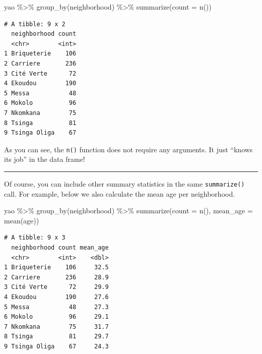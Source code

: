 \documentclass[
  letterpaper,
  DIV=11,
  numbers=noendperiod]{scrreprt}
\newenvironment{Shaded}{\begin{snugshade}}{\end{snugshade}}
\newcommand{\AttributeTok}[1]{\textcolor[rgb]{0.40,0.45,0.13}{#1}}
\newcommand{\FunctionTok}[1]{\textcolor[rgb]{0.28,0.35,0.67}{#1}}
\newcommand{\NormalTok}[1]{\textcolor[rgb]{0.00,0.23,0.31}{#1}}
\newcommand{\SpecialCharTok}[1]{\textcolor[rgb]{0.37,0.37,0.37}{#1}}
\begin{document}
\begin{Shaded}
\begin{Highlighting}[]
\NormalTok{yao }\SpecialCharTok{\%\textgreater{}\%} 
  \FunctionTok{group\_by}\NormalTok{(neighborhood) }\SpecialCharTok{\%\textgreater{}\%} 
  \FunctionTok{summarize}\NormalTok{(}\AttributeTok{count =} \FunctionTok{n}\NormalTok{())}
\end{Highlighting}
\end{Shaded}

\begin{verbatim}
# A tibble: 9 x 2
  neighborhood count
  <chr>        <int>
1 Briqueterie    106
2 Carriere       236
3 Cité Verte      72
4 Ekoudou        190
5 Messa           48
6 Mokolo          96
7 Nkomkana        75
8 Tsinga          81
9 Tsinga Oliga    67
\end{verbatim}

As you can see, the \texttt{n()} function does not require any
arguments. It just ``knows its job'' in the data frame!

\begin{center}\rule{0.5\linewidth}{0.5pt}\end{center}

Of course, you can include other summary statistics in the same
\texttt{summarize()} call. For example, below we also calculate the mean
age per neighborhood.

\begin{Shaded}
\begin{Highlighting}[]
\NormalTok{yao }\SpecialCharTok{\%\textgreater{}\%} 
  \FunctionTok{group\_by}\NormalTok{(neighborhood) }\SpecialCharTok{\%\textgreater{}\%} 
  \FunctionTok{summarize}\NormalTok{(}\AttributeTok{count =} \FunctionTok{n}\NormalTok{(), }
            \AttributeTok{mean\_age =} \FunctionTok{mean}\NormalTok{(age))}
\end{Highlighting}
\end{Shaded}

\begin{verbatim}
# A tibble: 9 x 3
  neighborhood count mean_age
  <chr>        <int>    <dbl>
1 Briqueterie    106     32.5
2 Carriere       236     28.9
3 Cité Verte      72     29.9
4 Ekoudou        190     27.6
5 Messa           48     27.3
6 Mokolo          96     29.1
7 Nkomkana        75     31.7
8 Tsinga          81     29.7
9 Tsinga Oliga    67     24.3
\end{verbatim}
\end{document}
